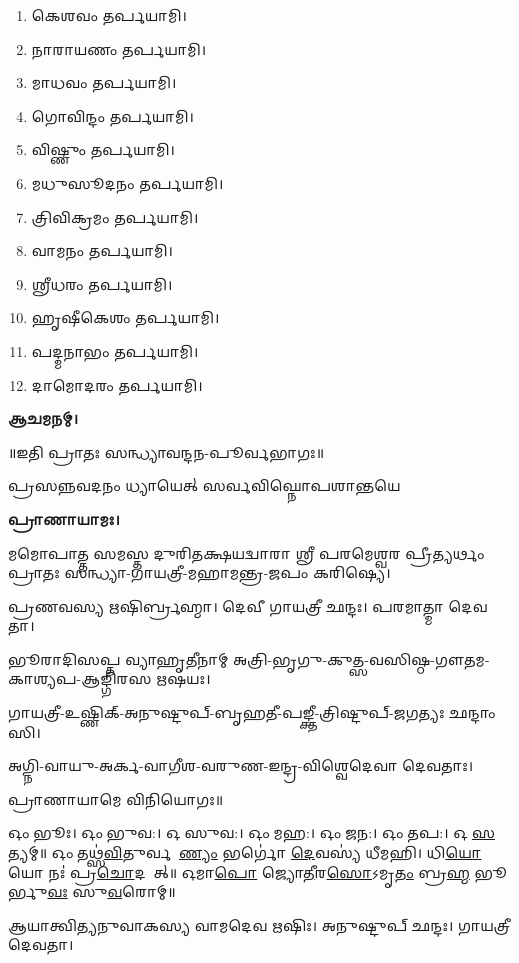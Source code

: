 
\begin{enumerate}
\item 𑌕𑍇𑌶𑌵𑌂 𑌤𑌰𑍍𑌪𑌯𑌾𑌮𑌿।
\item 𑌨𑌾𑌰𑌾𑌯𑌣𑌂 𑌤𑌰𑍍𑌪𑌯𑌾𑌮𑌿।
\item 𑌮𑌾𑌧𑌵𑌂 𑌤𑌰𑍍𑌪𑌯𑌾𑌮𑌿।
\item 𑌗𑍋𑌵𑌿𑌨𑍍𑌦𑌂 𑌤𑌰𑍍𑌪𑌯𑌾𑌮𑌿।
\item 𑌵𑌿𑌷𑍍𑌣𑍁𑌂 𑌤𑌰𑍍𑌪𑌯𑌾𑌮𑌿।
\item 𑌮𑌧𑍁𑌸𑍂𑌦𑌨𑌂 𑌤𑌰𑍍𑌪𑌯𑌾𑌮𑌿।
\item 𑌤𑍍𑌰𑌿𑌵𑌿𑌕𑍍𑌰𑌮𑌂 𑌤𑌰𑍍𑌪𑌯𑌾𑌮𑌿।
\item 𑌵𑌾𑌮𑌨𑌂 𑌤𑌰𑍍𑌪𑌯𑌾𑌮𑌿।
\item 𑌶𑍍𑌰𑍀𑌧𑌰𑌂 𑌤𑌰𑍍𑌪𑌯𑌾𑌮𑌿।
\item 𑌹𑍃𑌷𑍀𑌕𑍇𑌶𑌂 𑌤𑌰𑍍𑌪𑌯𑌾𑌮𑌿।
\item 𑌪𑌦𑍍𑌮𑌨𑌾𑌭𑌂 𑌤𑌰𑍍𑌪𑌯𑌾𑌮𑌿।
\item 𑌦𑌾𑌮𑍋𑌦𑌰𑌂 𑌤𑌰𑍍𑌪𑌯𑌾𑌮𑌿।
\end{enumerate}

\textbf{𑌆𑌚𑌮𑌨𑌮𑍍।}


\centerline{॥𑌇𑌤𑌿 𑌪𑍍𑌰𑌾𑌤𑌃 𑌸𑌨𑍍𑌧𑍍𑌯𑌾𑌵𑌨𑍍𑌦𑌨-𑌪𑍂𑌰𑍍𑌵𑌭𑌾𑌗𑌃॥}



{𑌪𑍍𑌰𑌸𑌨𑍍𑌨𑌵𑌦𑌨𑌂 𑌧𑍍𑌯𑌾𑌯𑍇𑌤𑍍 𑌸𑌰𑍍𑌵𑌵𑌿𑌘𑍍𑌨𑍋𑌪𑌶𑌾𑌨𑍍𑌤𑌯𑍇}

\textbf{𑌪𑍍𑌰𑌾𑌣𑌾𑌯𑌾𑌮𑌃।}

𑌮𑌮𑍋𑌪𑌾𑌤𑍍𑌤 𑌸𑌮𑌸𑍍𑌤 𑌦𑍁𑌰𑌿𑌤𑌕𑍍𑌷𑌯𑌦𑍍𑌵𑌾𑌰𑌾 𑌶𑍍𑌰𑍀 𑌪𑌰𑌮𑍇𑌶𑍍𑌵𑌰 𑌪𑍍𑌰𑍀𑌤𑍍𑌯𑌰𑍍𑌥𑌂 𑌪𑍍𑌰𑌾𑌤𑌃 𑌸𑌨𑍍𑌧𑍍𑌯𑌾-𑌗𑌾𑌯𑌤𑍍𑌰𑍀-𑌮𑌹𑌾𑌮𑌨𑍍𑌤𑍍𑌰-𑌜𑌪𑌂 𑌕𑌰𑌿𑌷𑍍𑌯𑍇।


𑌪𑍍𑌰𑌣𑌵𑌸𑍍𑌯 𑌋𑌷𑌿𑌰𑍍𑌬𑍍𑌰𑌹𑍍𑌮𑌾।
𑌦𑍇𑌵𑍀 𑌗𑌾𑌯𑌤𑍍𑌰𑍀 𑌛𑌨𑍍𑌦𑌃।
𑌪𑌰𑌮𑌾𑌤𑍍𑌮𑌾 𑌦𑍇𑌵𑌤𑌾।

𑌭𑍂𑌰𑌾𑌦𑌿𑌸𑌪𑍍𑌤 𑌵𑍍𑌯𑌾𑌹𑍃𑌤𑍀𑌨𑌾𑌮𑍍 𑌅𑌤𑍍𑌰𑌿-𑌭𑍃𑌗𑍁-𑌕𑍁𑌤𑍍𑌸-𑌵𑌸𑌿𑌷𑍍𑌠-𑌗𑍗𑌤𑌮-𑌕𑌾𑌶𑍍𑌯𑌪-𑌆𑌙𑍍𑌗𑌿𑌰𑌸 𑌋𑌷𑌯𑌃।

𑌗𑌾𑌯𑌤𑍍𑌰𑍀-𑌉𑌷𑍍𑌣𑌿𑌕𑍍-𑌅𑌨𑍁𑌷𑍍𑌟𑍁𑌪𑍍-𑌬𑍃𑌹𑌤𑍀-𑌪𑌙𑍍𑌕𑍍𑌤𑍀-𑌤𑍍𑌰𑌿𑌷𑍍𑌟𑍁𑌪𑍍-𑌜𑌗𑌤𑍍𑌯𑌃 𑌛𑌨𑍍𑌦𑌾𑌂𑌸𑌿।

𑌅𑌗𑍍𑌨𑌿-𑌵𑌾𑌯𑍁-𑌅𑌰𑍍𑌕-𑌵𑌾𑌗𑍀𑌶-𑌵𑌰𑍁𑌣-𑌇𑌨𑍍𑌦𑍍𑌰-𑌵𑌿𑌶𑍍𑌵𑍇𑌦𑍇𑌵𑌾 𑌦𑍇𑌵𑌤𑌾𑌃।
      
𑌪𑍍𑌰𑌾𑌣𑌾𑌯𑌾𑌮𑍇 𑌵𑌿𑌨𑌿𑌯𑍋𑌗𑌃॥


𑌓𑌂 𑌭𑍂𑌃। 𑌓𑌂 𑌭𑍁𑌵:। 𑌓 𑌸𑍁𑌵:। 𑌓𑌂 𑌮𑌹:। 𑌓𑌂 𑌜𑌨:। 𑌓𑌂 𑌤𑌪:। 𑌓 \ul{𑌸}𑌤𑍍𑌯𑌮𑍍॥
𑌓𑌂 𑌤𑌥𑍍𑌸॑\ul{𑌵𑌿}𑌤𑍁𑌰𑍍𑌵𑌰𑍇᳚\ul{𑌣𑍍𑌯𑌂} 𑌭𑌰𑍍𑌗𑍋॑ \ul{𑌦𑍇}𑌵𑌸𑍍𑌯॑ 𑌧𑍀𑌮𑌹𑌿। 𑌧𑌿\ul{𑌯𑍋} 𑌯𑍋 𑌨𑌃॑ 𑌪𑍍𑌰\ul{𑌚𑍋}𑌦𑌯𑌾᳚𑌤𑍍॥
𑌓𑌮𑌾\ul{𑌪𑍋} 𑌜𑍍𑌯𑍋\ul{𑌤𑍀}𑌰\ul{𑌸𑍋}𑌽𑌮𑍃\ul{𑌤𑌂} 𑌬𑍍𑌰\ul{𑌹𑍍𑌮} 𑌭𑍂𑌰𑍍𑌭𑍁\ul{𑌵𑌃} 𑌸𑍁\ul{𑌵}𑌰𑍋𑌮𑍍॥




𑌆𑌯𑌾𑌤𑍍𑌵𑌿𑌤𑍍𑌯𑌨𑍁𑌵𑌾𑌕𑌸𑍍𑌯 𑌵𑌾𑌮𑌦𑍇𑌵 𑌋𑌷𑌿𑌃।
𑌅𑌨𑍁𑌷𑍍𑌟𑍁𑌪𑍍 𑌛𑌨𑍍𑌦𑌃।
𑌗𑌾𑌯𑌤𑍍𑌰𑍀 𑌦𑍇𑌵𑌤𑌾।

